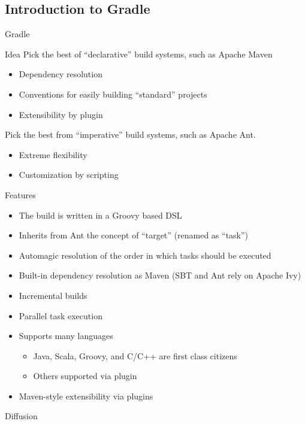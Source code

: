 \documentclass[presentation]{beamer}
\begin{document}
\subsection{Introduction to Gradle}

\begin{frame}{Gradle}
	\begin{block}{Idea}
		Pick the best of ``declarative'' build systems, such as Apache Maven
		\begin{itemize}
			\item Dependency resolution
			\item Conventions for easily building ``standard'' projects
			\item Extensibility by plugin
		\end{itemize}
		Pick the best from ``imperative'' build systems, such as Apache Ant.
		\begin{itemize}
			\item Extreme flexibility
			\item Customization by scripting
		\end{itemize}
	\end{block}
	\begin{block}{Features}
		\begin{itemize}
			\item The build is written in a Groovy based DSL
			\item Inherits from Ant the concept of ``target'' (renamed as ``task'')
			\item Automagic resolution of the order in which tasks should be executed
			\item Built-in dependency resolution as Maven (SBT and Ant rely on Apache Ivy)
			\item Incremental builds
			\item Parallel task execution
			\item Supports many languages
			\begin{itemize}
                \item Java, Scala, Groovy, and C/C++ are first class citizens
                \item Others supported via plugin
			\end{itemize}
			\item Maven-style extensibility via plugins
		\end{itemize}
	\end{block}
	\begin{block}{Diffusion}
		\begin{itemize}

\end{itemize}
\end{block}
\end{frame}
\end{document}
